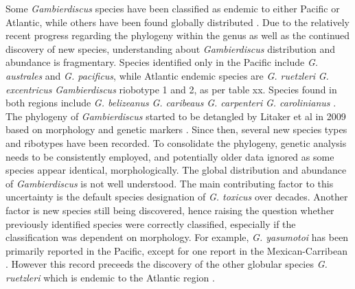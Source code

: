 \documentclass[12pt]{article}
\begin{document}
Some \emph{Gambierdiscus} species have been classified as endemic to either Pacific or Atlantic, while others have been found globally distributed \cite{berdalet2012global,litaker2010global}. Due to the relatively recent progress regarding the phylogeny within the genus as well as the continued discovery of new species, understanding about \emph{Gambierdiscus} distribution and abundance is fragmentary.
Species identified only in the Pacific include \emph{G. australes} and \emph{G. pacificus}, while Atlantic endemic species are \emph{G. ruetzleri} \emph{G. excentricus} \emph{Gambierdiscus} riobotype 1 and 2, as per table xx. Species found in both regions include \emph{G. belizeanus} \emph{G. caribeaus} \emph{G. carpenteri} \emph{G. carolinianus} \cite{litaker2010global,litaker2009taxonomy,berdalet2012global}. %
The phylogeny of \emph{Gambierdiscus} started to be detangled by Litaker et al in 2009 based on morphology and genetic markers \cite{litaker2009taxonomy}. Since then, several new species types and ribotypes have been recorded. To consolidate the phylogeny, genetic analysis needs to be consistently employed, and potentially older data ignored as some species appear identical, morphologically.
The global distribution and abundance of \emph{Gambierdiscus} is not well understood. The main contributing factor to this uncertainty is the default species designation of \emph{G. toxicus} over decades. Another factor is new species still being discovered, hence raising the question whether previously identified species were correctly classified, especially if the classification was dependent on morphology. 
For example, \emph{G. yasumotoi} has been primarily reported in the Pacific, except for one report in the Mexican-Carribean \cite{hernandez2004species}. However this record preceeds the discovery of the other globular species \emph{G. ruetzleri} which is endemic to the Atlantic region \cite{litaker2009taxonomy}.
     
\end{document}
